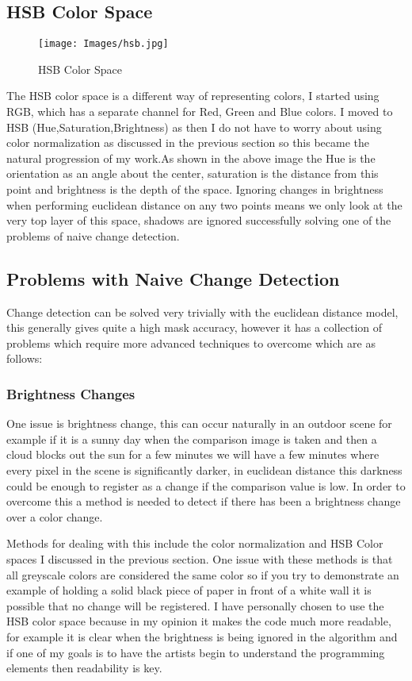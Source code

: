 \documentclass[a4paper]{report}
\begin{document}
\subsection{HSB Color Space}
\begin{figure}[!ht]
\centering
\texttt{[image: Images/hsb.jpg]}
\caption{\label{fig:Doughnut}HSB Color Space}
\end{figure}
The HSB color space is a different way of representing colors, I started using RGB, which has a separate channel for Red, Green and Blue colors. I moved to HSB (Hue,Saturation,Brightness) as then I do not have to worry about using color normalization as discussed in the previous section so this became the natural progression of my work.As shown in the above image the Hue is the orientation as an angle about the center, saturation is the distance from this point and brightness is the depth of the space. Ignoring changes in brightness when performing euclidean distance on any two points means we only look at the very top layer of this space, shadows are ignored successfully solving one of the problems of naive change detection.

\subsection{Problems with Naive Change Detection}
Change detection can be solved very trivially with the euclidean distance model, this generally gives quite a high mask accuracy, however it has a collection of problems which require more advanced techniques to overcome which are as follows:

\subsubsection{Brightness Changes}
One issue is brightness change, this can occur naturally in an outdoor scene for example if it is a sunny day when the comparison image is taken and then a cloud blocks out the sun for a few minutes we will have a few minutes where every pixel in the scene is significantly darker, in euclidean distance this darkness could be enough to register as a change if the comparison value is low. In order to overcome this a method is needed to detect if there has been a brightness change over a color change.

Methods for dealing with this include the color normalization and HSB Color spaces I discussed in the previous section. One issue with these methods is that all greyscale colors are considered the same color so if you try to demonstrate an example of holding a solid black piece of paper in front of a white wall it is possible that no change will be registered. I have personally chosen to use the HSB color space because in my opinion it makes the code much more readable, for example it is clear when the brightness is being ignored in the algorithm and if one of my goals is to have the artists begin to understand the programming elements then readability is key.
\end{document}
